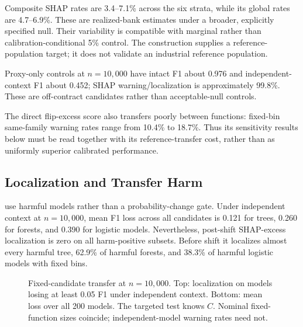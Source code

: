 \documentclass[conference]{IEEEtran}
\begin{document}
Composite SHAP rates are 3.4--7.1\% across the six strata, while its global rates are 4.7--6.9\%. These are realized-bank estimates under a broader, explicitly specified null. Their variability is compatible with marginal rather than calibration-conditional 5\% control. The construction supplies a reference-population target; it does not validate an industrial reference population.

Proxy-only controls at $n=10{,}000$ have intact F1 about 0.976 and independent-context F1 about 0.452; SHAP warning/localization is approximately 99.8\%. These are off-contract candidates rather than acceptable-null controls.

The direct flip-excess score also transfers poorly between functions: fixed-bin same-family warning rates range from 10.4\% to 18.7\%. Thus its sensitivity results below must be read together with its reference-transfer cost, rather than as uniformly superior calibrated performance.

\subsection{Localization and Transfer Harm}
 use harmful models rather than a probability-change gate. Under independent context at $n=10{,}000$, mean F1 loss across all candidates is 0.121 for trees, 0.260 for forests, and 0.390 for logistic models. Nevertheless, post-shift SHAP-excess localization is zero on all harm-positive subsets. Before shift it localizes almost every harmful tree, 62.9\% of harmful forests, and 38.3\% of harmful logistic models with fixed bins.

\begin{table}[t]
\centering
\caption{Localization (\%) on $N_H$ harm-positive candidates before and after independent-context shift ($\epsilon=0.50$). Mean F1 loss averages all 200 candidates. Both excess scores use fixed-function observed-bin calibration; their self-warning rates are near 5\%, but their independent-model rates differ (see text). The targeted context test localizes all harm-positive candidates in these strata.}
\label{tab:transfer-harm}
\footnotesize

\end{table}

\begin{figure}[t]
\centering

\caption{Fixed-candidate transfer at $n=10{,}000$. Top: localization on models losing at least 0.05 F1 under independent context. Bottom: mean loss over all 200 models. The targeted test knows $C$. Nominal fixed-function sizes coincide; independent-model warning rates need not.}
\label{fig:transfer-harm}
\end{figure}
\end{document}
